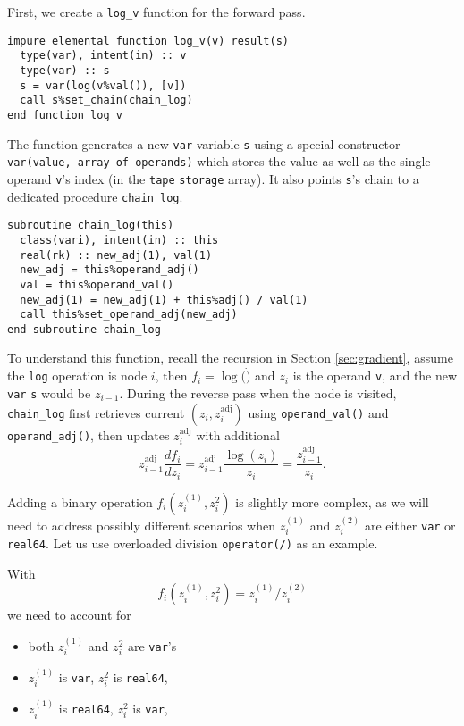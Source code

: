 \documentclass[12pt, reqno, oneside]{amsbook}
\begin{document}
First, we create a \texttt{log\_v} function for the forward pass.
\begin{verbatim}
impure elemental function log_v(v) result(s)
  type(var), intent(in) :: v
  type(var) :: s
  s = var(log(v%val()), [v])
  call s%set_chain(chain_log)
end function log_v
\end{verbatim}
The function generates a new \texttt{var} variable \texttt{s} using a special
constructor \texttt{var(value, array of operands)} which stores the value as
well as the single operand \texttt{v}'s index (in the \texttt{tape} \texttt{storage}
array). It also points \texttt{s}'s chain to a dedicated procedure \texttt{chain\_log}.
\begin{verbatim}
subroutine chain_log(this)
  class(vari), intent(in) :: this
  real(rk) :: new_adj(1), val(1)
  new_adj = this%operand_adj()
  val = this%operand_val()
  new_adj(1) = new_adj(1) + this%adj() / val(1)
  call this%set_operand_adj(new_adj)
end subroutine chain_log
\end{verbatim}
To understand this function, recall the recursion in Section \ref{sec:gradient},
assume the \texttt{log} operation is node \(i\), then \(f_i=\log(\dot)\) and
\(z_i\) is the operand \texttt{v}, and the new \texttt{var} \texttt{s} would be
\(z_{i-1}\). During the reverse pass when the node is visited, \texttt{chain\_log} 
first retrieves current \((z_i, z_i^{\text{adj}})\)
using \texttt{operand\_val()} and \texttt{operand\_adj()}, then updates
\(z_i^{\text{adj}}\) with additional
\begin{equation*}
z_{i-1}^{\text{adj}} \frac{df_i}{dz_i} = z_{i-1}^{\text{adj}}\frac{\log(z_i)}{z_i}=\frac{z_{i-1}^{\text{adj}}}{z_i}.
\end{equation*}

Adding a binary operation \(f_i(z_i^{(1)}, z_i^{2})\) is slightly more complex, as we will need to
address possibly different scenarios when \(z_i^{(1)}\) and \(z_i^{(2)}\)
are either \texttt{var} or \texttt{real64}. Let us use overloaded division \texttt{operator(/)} as an example.

With
\begin{equation*}
f_i(z_i^{(1)}, z_i^{2}) = z_i^{(1)} / z_i^{(2)}
\end{equation*}
we need to account for
\begin{itemize}
\item both \(z_i^{(1)}\) and \(z_i^{2}\) are \texttt{var}'s
\item \(z_i^{(1)}\) is \texttt{var}, \(z_i^{2}\) is \texttt{real64},
\item \(z_i^{(1)}\) is \texttt{real64}, \(z_i^{2}\) is \texttt{var},
\end{itemize}
\end{document}
